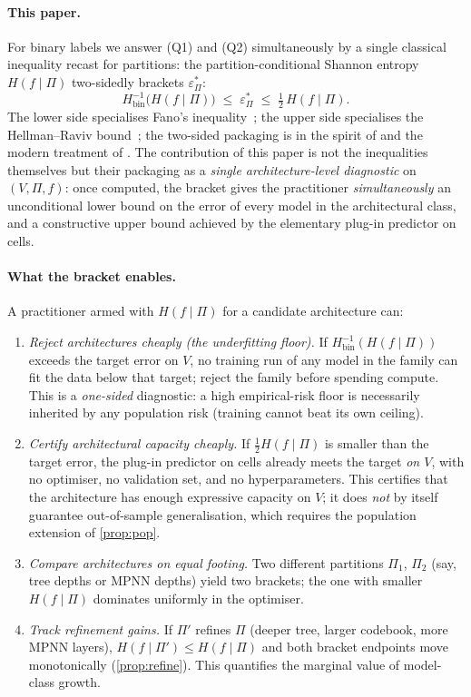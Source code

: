 \documentclass[10pt]{article}
\theoremstyle{definition}
\theoremstyle{remark}
\newcommand{\Hinv}{H_{\mathrm{bin}}^{-1}}
\newcommand{\eps}{\varepsilon}
\newcommand{\epsP}{\eps^{\!*}_{\Pi}}
\begin{document}
\paragraph{This paper.} For binary labels we answer (Q1) and (Q2)
simultaneously by a single classical inequality recast for
partitions: the partition-conditional Shannon entropy
$H(f \mid \Pi)$ two-sidedly brackets $\epsP$:
\[
  \Hinv\!\bigl(H(f \mid \Pi)\bigr)
  \;\le\; \epsP \;\le\; \tfrac{1}{2}\,H(f \mid \Pi).
\]
The lower side specialises Fano's inequality~\citep{fano1961};
the upper side specialises the Hellman--Raviv
bound~\citep{hellmanraviv1970}; the two-sided packaging is in the
spirit of \citet{feder1994} and the modern treatment of
\citet{ho2010interplay}. The contribution of this paper is not
the inequalities themselves but their packaging as a
\emph{single architecture-level diagnostic} on $(V, \Pi, f)$:
once computed, the bracket gives the practitioner
\emph{simultaneously} an unconditional lower bound on the error
of every model in the architectural class, and a constructive
upper bound achieved by the elementary plug-in predictor on
cells.

\paragraph{What the bracket enables.} A practitioner armed with
$H(f \mid \Pi)$ for a candidate architecture can:
\begin{enumerate}[(E1)]
  \item \emph{Reject architectures cheaply (the underfitting
    floor).} If $\Hinv(H(f \mid \Pi))$ exceeds the target error
    on $V$, no training run of any model in the family can fit
    the data below that target; reject the family before
    spending compute. This is a \emph{one-sided} diagnostic: a
    high empirical-risk floor is necessarily inherited by any
    population risk (training cannot beat its own ceiling).
  \item \emph{Certify architectural capacity cheaply.} If
    $\tfrac{1}{2} H(f \mid \Pi)$ is smaller than the target
    error, the plug-in predictor on cells already meets the
    target \emph{on $V$}, with no optimiser, no validation set,
    and no hyperparameters. This certifies that the architecture
    has enough expressive capacity on $V$; it does \emph{not}
    by itself guarantee out-of-sample generalisation, which
    requires the population extension of \cref{prop:pop}.
  \item \emph{Compare architectures on equal footing.} Two
    different partitions $\Pi_{1}$, $\Pi_{2}$ (say, tree depths
    or MPNN depths) yield two brackets; the one with smaller
    $H(f \mid \Pi)$ dominates uniformly in the optimiser.
  \item \emph{Track refinement gains.} If $\Pi'$ refines $\Pi$
    (deeper tree, larger codebook, more MPNN layers),
    $H(f \mid \Pi') \le H(f \mid \Pi)$ and both bracket
    endpoints move monotonically (\cref{prop:refine}). This
    quantifies the marginal value of model-class growth.
\end{enumerate}
\end{document}
